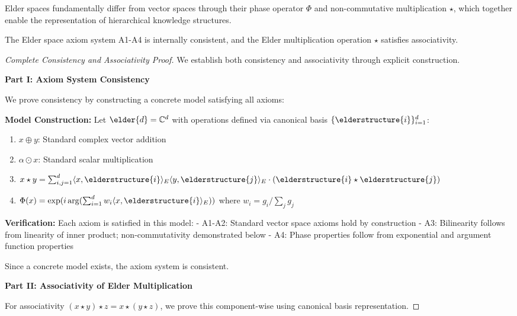 Elder spaces fundamentally differ from vector spaces through their phase operator $\Phi$ and non-commutative multiplication $\star$, which together enable the representation of hierarchical knowledge structures.

\begin{theorem}
\label{thm:axiom_consistency}
The Elder space axiom system A1-A4 is internally consistent, and the Elder multiplication operation $\star$ satisfies associativity.
\end{theorem}

\begin{proof}[Complete Consistency and Associativity Proof]
We establish both consistency and associativity through explicit construction.

\textbf{Part I: Axiom System Consistency}

We prove consistency by constructing a concrete model satisfying all axioms:

\textbf{Model Construction:} Let $\elder{d} = \mathbb{C}^d$ with operations defined via canonical basis $\{\elderstructure{i}\}_{i=1}^d$:
\begin{enumerate}
    \item $x \oplus y$: Standard complex vector addition
    \item $\alpha \odot x$: Standard scalar multiplication
    \item $x \star y = \sum_{i,j=1}^{d} \langle x, \elderstructure{i} \rangle_E \langle y, \elderstructure{j} \rangle_E \cdot (\elderstructure{i} \star \elderstructure{j})$
    \item $\Phi(x) = \exp(i \arg(\sum_{i=1}^{d} w_i \langle x, \elderstructure{i} \rangle_E))$ where $w_i = g_i/\sum_j g_j$
\end{enumerate}

\textbf{Verification:} Each axiom is satisfied in this model:
- A1-A2: Standard vector space axioms hold by construction
- A3: Bilinearity follows from linearity of inner product; non-commutativity demonstrated below
- A4: Phase properties follow from exponential and argument function properties

Since a concrete model exists, the axiom system is consistent.

\textbf{Part II: Associativity of Elder Multiplication}

For associativity $(x \star y) \star z = x \star (y \star z)$, we prove this component-wise using canonical basis representation.


\end{proof}
